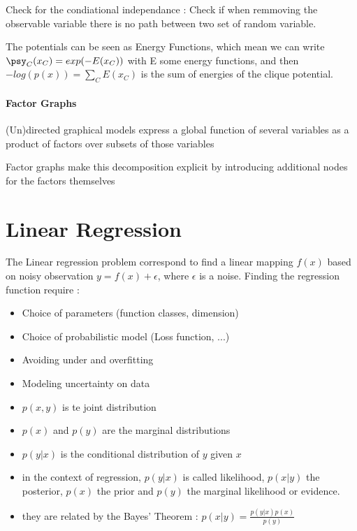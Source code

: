 				Check for the condiational independance : Check if when remmoving the observable variable there is no path between two set of random variable.

				The potentials can be seen as Energy Functions, which mean we can write $\psy_C(x_C) = exp(-E(x_C))$ with E some energy functions, and then $-log(p(x)) = \sum_C E(x_C)$ is the sum of energies of the clique potential.



			\paragraph*{Factor Graphs}

				(Un)directed graphical models express a global function of several variables as a product of factors over subsets of those variables

				Factor graphs make this decomposition explicit by introducing additional nodes for the factors themselves


\section{Linear Regression}

	The Linear regression problem correspond to find a linear mapping $f(x)$ based on noisy observation $y = f(x) + \epsilon$, where $\epsilon$ is a noise. 
	Finding the regression function require : 
	\begin{itemize}
		\item Choice of parameters (function classes, dimension)
		\item Choice of probabilistic model (Loss function, ...)
		\item Avoiding under and overfitting
		\item Modeling uncertainty on data
	\end{itemize}

	\begin{definition}
			\begin{itemize}
				\item $p(x, y)$ is te joint distribution
				\item $p(x)$ and $p(y)$ are the marginal distributions
				\item $p(y|x)$ is the conditional distribution of $y$ given $x$
			 	\item in the context of regression, $p(y|x)$ is called likelihood, $p(x|y)$ the posterior, $p(x)$ the prior and $p(y)$ the marginal likelihood or evidence.
			 	\item they are related by the Bayes' Theorem : $p(x|y) = \frac{p(y|x)p(x)}{p(y)}$ 
			\end{itemize}
		\end{definition}

